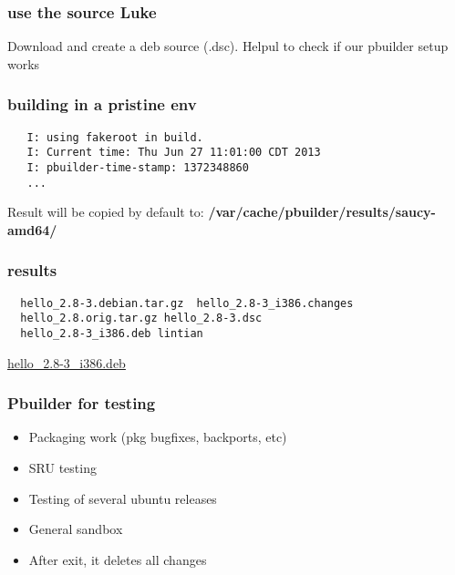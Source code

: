 \documentclass[dvipsnames]{beamer}
\begin{document}
\begin{frame}
  \frametitle{use the source Luke}
  \begin{center}
        {\vspace{3 mm}}
        {\vspace{3 mm}}
  \end{center}
  \begin{center}
      {Download and create a deb source (.dsc).}
      {\vspace{0.5 mm}}
      {Helpul to check if our pbuilder setup works}
  \end{center}
\end{frame}

\begin{frame}[fragile]
  \frametitle{building in a pristine env}
  \begin{center}
  \end{center}
  \begin{verbatim}
   I: using fakeroot in build.
   I: Current time: Thu Jun 27 11:01:00 CDT 2013
   I: pbuilder-time-stamp: 1372348860
   ...
  \end{verbatim}
  \begin{center}
  Result will be copied by default to: \textbf{/var/cache/pbuilder/results/saucy-amd64/}
  \end{center}
\end{frame}

\begin{frame}[fragile]
  \frametitle{results}
  \begin{center}
  \end{center}
  \begin{verbatim}
  hello_2.8-3.debian.tar.gz  hello_2.8-3_i386.changes
  hello_2.8.orig.tar.gz hello_2.8-3.dsc
  hello_2.8-3_i386.deb lintian
  \end{verbatim}
  \begin{center}
      \url{hello_2.8-3_i386.deb}
  \end{center}
\end{frame}

\begin{frame}[fragile]
  \frametitle{Pbuilder for testing}
  \begin{center}
  \end{center}
  \begin{itemize}
  \item Packaging work (pkg bugfixes, backports, etc)
  \item SRU testing
  \item Testing of several ubuntu releases
  \item General sandbox
  \item After exit, it deletes all changes
  \end{itemize}
\end{frame}
\end{document}
